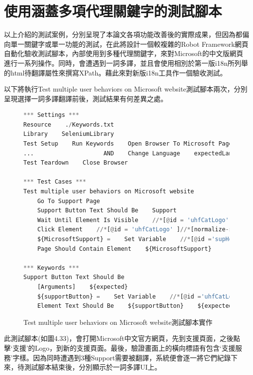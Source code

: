 \section{使用涵蓋多項代理關鍵字的測試腳本}
以上介紹的測試案例，分別呈現了本論文各項功能改善後的實際成果，但因為都偏向單一關鍵字或單一功能的測試，在此將設計一個較複雜的Robot Framework網頁自動化驗收測試腳本，內部使用到多種代理關鍵字，來對Microsoft的中文版網頁進行一系列操作。同時，會遭遇到一詞多譯，並且會使用相別於第一版i18n所列舉的html待翻譯屬性來撰寫XPath。藉此來對新版i18n工具作一個驗收測試。

以下將執行Test multiple user behaviors on Microsoft website測試腳本兩次，分別呈現選擇一詞多譯翻譯前後，測試結果有何差異之處。

\begin{figure}[H]
\begin{lstlisting}[language={python}]
*** Settings ***
Resource    ./Keywords.txt
Library    SeleniumLibrary
Test Setup    Run Keywords    Open Browser To Microsoft Page
...                    AND    Change Language    expectedLanguage=${language}
Test Teardown    Close Browser

*** Test Cases ***
Test multiple user behaviors on Microsoft website
    Go To Support Page
    Support Button Text Should Be    Support
    Wait Until Element Is Visible    //*[@id = 'uhfCatLogo' ]//*[normalize-space()='Support']
    Click Element    //*[@id = 'uhfCatLogo' ]//*[normalize-space()='Support']
    ${MicrosoftSupport} =    Set Variable    //*[@id ='supHomeAndLandingPageHeaderContainer']//*[contains(text(), 'Support')]
    Page Should Contain Element    ${MicrosoftSupport}

*** Keywords ***
Support Button Text Should Be
    [Arguments]    ${expected}
    ${supportButton} =    Set Variable    //*[@id ='uhfCatLogo']
    Element Text Should Be    ${supportButton}    ${expected}
\end{lstlisting}
\caption{Test multiple user behaviors on Microsoft website測試腳本實作}
\end{figure}
此測試腳本(如圖4.33)，會打開Microsoft中文官方網頁，先到支援頁面，之後點擊‘支援’的Logo，到新的支援頁面。最後，驗證畫面上的橫向標語有包含‘支援服務’字樣。因為同時遭遇到3種Support需要被翻譯，系統便會逐一將它們紀錄下來，待測試腳本結束後，分別顯示於一詞多譯UI上。

